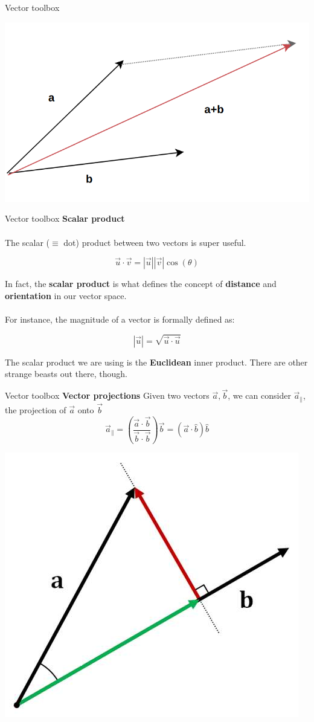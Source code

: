\documentclass{beamer}
\begin{document}
\begin{frame}{Vector toolbox}
	\begin{center}
	\includegraphics[width = 0.75\linewidth]{img/vector_addition.png}
	\end{center}
\end{frame}

\begin{frame}{Vector toolbox}
	\textbf{Scalar product}\\~\\
	The scalar ($\equiv$ dot) product between two vectors is super useful.
	
	$$\vec{u} \cdot \vec{v} = |\vec{u}||\vec{v}|\cos(\theta)$$
	
	In fact, the \textbf{scalar product} is what defines the concept of \textbf{distance} and \textbf{orientation} in our vector space.
	\\~\\
	For instance, the magnitude of a vector is formally defined as:
	
	$$|\vec{u}| = \sqrt{\vec{u}\cdot\vec{u}}$$
	
	The scalar product we are using is the \textbf{Euclidean} inner product. There are other strange beasts out there, though.
\end{frame}

\begin{frame}{Vector toolbox}
	\textbf{Vector projections}
	Given two vectors $\vec{a}, \vec{b}$, we can consider $\vec{a}_\parallel$, the projection of $\vec{a}$ onto $\vec{b}$
	$$\vec{a}_\parallel = \left(\dfrac{\vec{a}\cdot\vec{b}}{\vec{b}\cdot\vec{b}}\right)\vec{b} = (\vec{a}\cdot\hat{b})\hat{b}$$
	\begin{center}
	\includegraphics[width=0.50 	\linewidth]{img/vector_projection.png}
	\end{center}
\end{frame}
\end{document}
